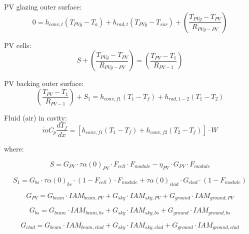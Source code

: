 PV glazing outer surface:
\begin{equation}
0=h_{conv,t}\left(T_{PVg}-T_{a}\right)+h_{rad,t}\left(T_{PVg}-T_{sur}\right)+\left(\frac{T_{PVg}-T_{PV}}{R_{PVg-PV}}\right)
\label{eq:BIPVT-pv-outer-surf}
\end{equation}

PV cells:
\begin{equation}
S+\left(\frac{T_{PVg}-T_{PV}}{R_{PVg-PV}}\right)=\left(\frac{T_{PV}-T_{1}}{R_{PV-1}}\right)
\label{eq:BIPVT-pv-cells}
\end{equation}

PV backing outer surface:
\begin{equation}
\left(\frac{T_{PV}-T_{1}}{R_{PV-1}}\right)+S_{1}=h_{conv,f1}\left(T_{1}-T_{f}\right)+h_{rad,1-2}\left(T_{1}-T_{2}\right)
\label{eq:BIPVT-PV-back}
\end{equation}

Fluid (air) in cavity:
\begin{equation}
\dot{m}C_{p}\frac{dT_{f}}{dx}=\left[h_{conv,f1}\left(T_{1}-T_{f}\right)+h_{conv,f2}\left(T_{2}-T_{f}\right)\right]\cdot W
\label{eq:BIPVT-cavity-air}
\end{equation}

where:

\begin{equation}
S=G_{PV}\cdot\tau\alpha (0)_{PV}\cdot F_{cell}\cdot F_{module}-\eta_{PV}\cdot G_{PV}\cdot F_{module}
\label{eq:BIPVT-S}
\end{equation}

\begin{equation}
S_{1}=G_{bs}\cdot\tau\alpha (0)_{bs}\cdot \left(1-F_{cell}\right)\cdot F_{module}+\tau\alpha (0)_{clad}\cdot G_{clad}\cdot \left(1-F_{module}\right)
\label{eq:BIPVT-S1}
\end{equation}

\begin{equation}
G_{PV}=G_{beam}\cdot IAM_{beam,PV}+G_{sky}\cdot IAM_{sky,PV}+G_{ground}\cdot IAM_{ground,PV}
\label{eq:BIPVT-G-PV}
\end{equation}

\begin{equation}
G_{bs}=G_{beam}\cdot IAM_{beam,bs}+G_{sky}\cdot IAM_{sky,bs}+G_{ground}\cdot IAM_{ground,bs}
\label{eq:BIPVT-G-bs}
\end{equation}

\begin{equation}
G_{clad}=G_{beam}\cdot IAM_{beam,clad}+G_{sky}\cdot IAM_{sky,clad}+G_{ground}\cdot IAM_{ground,clad}
\label{eq:BIPVT-G-clad}
\end{equation}

